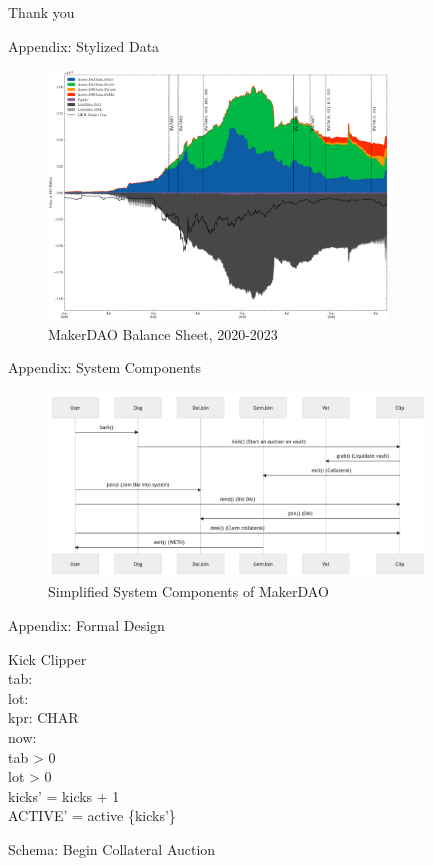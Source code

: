 \documentclass{beamer}
\begin{document}
\begin{frame}{Thank you}

\end{frame}

\begin{frame}{Appendix: Stylized Data}
\begin{figure}
\centering
\includegraphics[width=90mm]{Figs/historical_balancesheet_with_votes.png}
\caption{MakerDAO Balance Sheet, 2020-2023}
\label{fig1}
\end{figure}
\end{frame}

\begin{frame}{Appendix: System Components}
\begin{figure}
\centering
\includegraphics[width=100mm]{resources/system.png}
\caption{Simplified System Components of MakerDAO}
\label{fig2}
\end{figure}
\end{frame}

\begin{frame}{Appendix: Formal Design}
\begin{schema}{Kick}
\Delta Clipper \\
tab: \real \\
lot: \real \\
kpr: \seq CHAR \\
now: \nat \\
\where
tab > 0 \\
lot > 0 \\
kicks' = kicks + 1 \\
ACTIVE' = active \cup \{kicks'\} \\
\end{schema}

\centering
\normalsize{Schema: Begin Collateral Auction}
\vfill  %
\end{frame}
\end{document}
